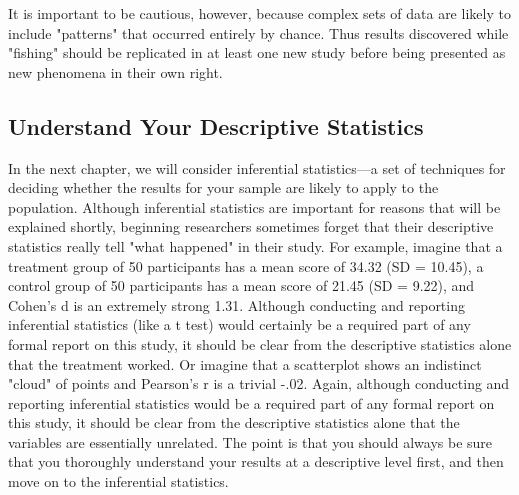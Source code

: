 It is important to be cautious, however, because complex sets of data are likely to include "patterns" that occurred entirely by chance. Thus results discovered while "fishing" should be replicated in at least one new study before being presented as new phenomena in their own right.

\subsection{Understand Your Descriptive Statistics}

In the next chapter, we will consider inferential statistics---a set of techniques for deciding whether the results for your sample are likely to apply to the population. Although inferential statistics are important for reasons that will be explained shortly, beginning researchers sometimes forget that their descriptive statistics really tell "what happened" in their study. For example, imagine that a treatment group of 50 participants has a mean score of 34.32 (SD = 10.45), a control group of 50 participants has a mean score of 21.45 (SD = 9.22), and Cohen's d is an extremely strong 1.31. Although conducting and reporting inferential statistics (like a t test) would certainly be a required part of any formal report on this study, it should be clear from the descriptive statistics alone that the treatment worked. Or imagine that a scatterplot shows an indistinct "cloud" of points and Pearson's r is a trivial -.02. Again, although conducting and reporting inferential statistics would be a required part of any formal report on this study, it should be clear from the descriptive statistics alone that the variables are essentially unrelated. The point is that you should always be sure that you thoroughly understand your results at a descriptive level first, and then move on to the inferential statistics.


